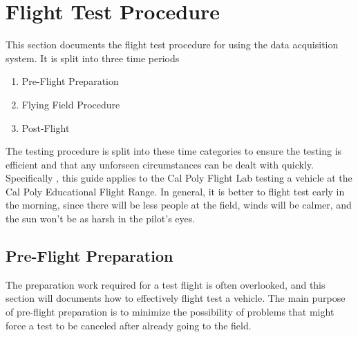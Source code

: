 \chapter{Flight Test Procedure}
This section documents the flight test procedure for using the data acquisition system. It is split into three time periods
\begin{enumerate}
\item Pre-Flight Preparation
\item Flying Field Procedure
\item Post-Flight 
\end{enumerate}
The testing procedure is split into these time categories to ensure the testing is efficient and that any unforseen circumstances can be dealt with quickly. Specifically , this guide applies to the Cal Poly Flight Lab testing a vehicle at the Cal Poly Educational Flight Range. In general, it is better to flight test early in the morning, since there will be less people at the field, winds will be calmer, and the sun won't be as harsh in the pilot's eyes.
\section{Pre-Flight Preparation}
The preparation work required for a test flight is often overlooked, and this section will documents how to effectively flight test a vehicle. The main purpose of pre-flight preparation is to minimize the possibility of problems that might force a test to be canceled after  already going to the field.
